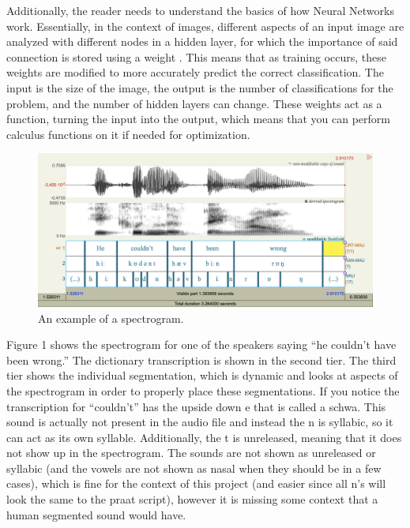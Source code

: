 \documentclass[10pt,twocolumn]{article}
\begin{document}
Additionally, the reader needs to understand the basics of how Neural Networks work. Essentially, in the context of images, different aspects of an input image are analyzed with different nodes in a hidden layer, for which the importance of said connection is stored using a weight \cite{NeuralNetworks}. This means that as training occurs, these weights are modified to more accurately predict the correct classification. The input is the size of the image, the output is the number of classifications for the problem, and the number of hidden layers can change. These weights act as a function, turning the input into the output, which means that you can perform calculus functions on it if needed for optimization. 

\begin{figure}
    \centering
    \includegraphics[width=.95\linewidth]{spectrogram.png}
    \caption{
        An example of a spectrogram.
    }
    \label{fig:first-page}
\end{figure}

Figure 1 shows the spectrogram for one of the speakers saying “he couldn’t have been wrong.” The dictionary transcription is shown in the second tier. The third tier shows the individual segmentation, which is dynamic and looks at aspects of the spectrogram in order to properly place these segmentations. If you notice the transcription for “couldn’t” has the upside down e that is called a schwa. This sound is actually not present in the audio file and instead the n is syllabic, so it can act as its own syllable. Additionally, the t is unreleased, meaning that it does not show up in the spectrogram. The sounds are not shown as unreleased or syllabic (and the vowels are not shown as nasal when they should be in a few cases), which is fine for the context of this project (and easier since all n’s will look the same to the praat script), however it is missing some context that a human segmented sound would have.
\end{document}
